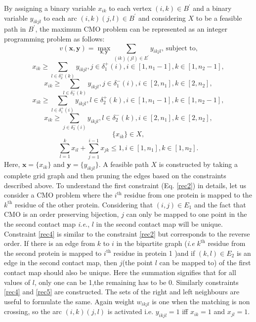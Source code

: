 By assigning a binary variable $x_{ik}$ to each vertex $(i,k)\in B^\prime$ and a binary variable $y_{ikjl}$ to each arc $(i,k)(j,l)\in B^\prime$ and considering $X$ to be a feasible path in $B^\prime$, the maximum CMO problem can be represented as an integer programming problem as follows:
\begin{equation}
\label{rec1}
v(\mathbf{x},\mathbf{y}) = \max_{\mathbf{x},\mathbf{y}} \sum\limits_{(ik)(jl) \in E^{\prime}} y_{ikjl} \text{, subject to,}
\end{equation}
\begin{equation}
\label{rec2}
x_{ik}  \geq \sum\limits_{l \in \delta _2 ^+(k)}  y_{ikjl} ,	    j\in {\delta _1^+(i)}, i \in [1,n_1-1] , k \in [1,n_2-1],
\end{equation}
\begin{equation}
\label{rec3}
x_{ik}  \geq \sum\limits_{l \in \delta _2 ^-(k)}  y_{ikjl} ,	    j\in {\delta _1^-(i)}, i \in [2,n_1] , k \in [2,n_2],
\end{equation}
\begin{equation}
\label{rec4}
x_{ik}  \geq \sum\limits_{l \in \delta _1 ^+(i)}  y_{ikjl} ,	    l\in {\delta _2^+(k)}, i \in [1,n_1-1] , k \in [1,n_2-1],
\end{equation}
\begin{equation}
\label{rec5}
x_{ik}  \geq \sum\limits_{j \in \delta _2 ^-(i)}  y_{ikjl} ,	    l\in {\delta _2^-(k)}, i \in [2,n_1] , k \in [2,n_2],
\end{equation}
\begin{equation}
\label{rec6}
\{x_{ik}\} \in X,
\end{equation}
\begin{equation}
\label{rec7}
\sum\limits_{l=1}^k  x_{il} + \sum\limits_{j=1}^{i-1}  x_{jk} \leq 1  ,          i \in [1,n_1], k \in [1, n_2].
\end{equation}
Here, $\mathbf{x} = \{x_{ik}\}$ and $\mathbf{y} = \{y_{ikjl}\}$. A feasible path $X$ is constructed by taking a complete grid graph and then pruning the edges based on the constraints described above. To understand the first constraint (Eq. \ref{rec2}) in details, let us consider a CMO problem where the $i^{\text{th}}$ residue from one protein is mapped to the $k^{\text{th}}$ residue of the other protein. Considering that $(i,j)\in E_{1}$ and the fact that CMO is an order preserving bijection, $j$ can only be mapped to one point in the the second contact map \emph{i.e.}, $l$ in the second contact map will be unique. Constraint \ref{rec4} is similar to the constraint \ref{rec2} but corresponds to the reverse order. If there is an edge from $k$ to $i$ in the bipartite graph (\emph{i.e} $k^{\text{th}}$ residue from the second protein is mapped to $i^{\text{th}}$ residue in protein 1 )and if $(k,l)\in E_{2}$ is an edge in the second contact map, then $j$(the point $l$ can be mapped to) of the first contact map should also be unique. Here the summation signifies that for all values of $l$, only one can be 1,the remaining has to be 0. Similarly constraints \ref{rec4} and \ref{rec5} are constructed. The sets of the right and left neighbours are useful to formulate the same. Again weight $w_{ikjl}$ is one when the matching is non crossing, so the arc $(i,k)(j,l)$ is activated i.e. $y_{ikjl} = 1$ iff $x_{ik} = 1$ and $x_{jl} = 1$.

